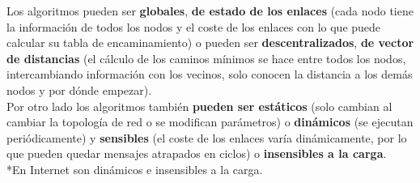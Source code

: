 \documentclass{article}
\begin{document}
Los algoritmos pueden ser \textbf{globales}, \textbf{de estado de los enlaces} (cada nodo tiene la información de todos los nodos y el coste de los enlaces con lo que puede calcular su tabla de encaminamiento) o pueden ser \textbf{descentralizados}, \textbf{de vector de distancias} (el cálculo de los caminos mínimos se hace entre todos los nodos, intercambiando información con los vecinos, solo conocen la distancia a los demás nodos y por dónde empezar). \\

Por otro lado los algoritmos también \textbf{pueden ser estáticos} (solo cambian al cambiar la topología de red o se modifican parámetros) o \textbf{dinámicos} (se ejecutan periódicamente) y \textbf{sensibles} (el coste de los enlaces varía dinámicamente, por lo que pueden quedar mensajes atrapados en ciclos) o \textbf{insensibles a la carga}. \\ *En Internet son dinámicos e insensibles a la carga. \\
\end{document}
